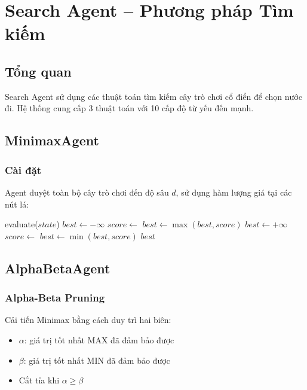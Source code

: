 \section{Search Agent -- Phương pháp Tìm kiếm}

\subsection{Tổng quan}
Search Agent sử dụng các thuật toán tìm kiếm cây trò chơi cổ điển để chọn nước đi. Hệ thống cung cấp 3 thuật toán với 10 cấp độ từ yếu đến mạnh.

\subsection{MinimaxAgent}

\subsubsection{Cài đặt}
Agent duyệt toàn bộ cây trò chơi đến độ sâu $d$, sử dụng hàm lượng giá tại các nút lá:

\begin{algorithm}[H]
\caption{Minimax Search}
\begin{algorithmic}[1]
        \State \Return evaluate($state$)
    \EndIf
        \State $best \leftarrow -\infty$
            \State $score \leftarrow$ 
            \State $best \leftarrow \max(best, score)$
        \EndFor
    \Else
        \State $best \leftarrow +\infty$
            \State $score \leftarrow$ 
            \State $best \leftarrow \min(best, score)$
        \EndFor
    \EndIf
    \State \Return $best$
\EndFunction
\end{algorithmic}
\end{algorithm}

\subsection{AlphaBetaAgent}

\subsubsection{Alpha-Beta Pruning}
Cải tiến Minimax bằng cách duy trì hai biên:
\begin{itemize}
    \item $\alpha$: giá trị tốt nhất MAX đã đảm bảo được
    \item $\beta$: giá trị tốt nhất MIN đã đảm bảo được
    \item Cắt tỉa khi $\alpha \geq \beta$
\end{itemize}

